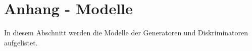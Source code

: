 \chapter{Anhang - Modelle}
In diesem Abschnitt werden die Modelle der Generatoren und Diskriminatoren aufgelistet.


\newpage

\newpage

\newpage


\cleardoublepage